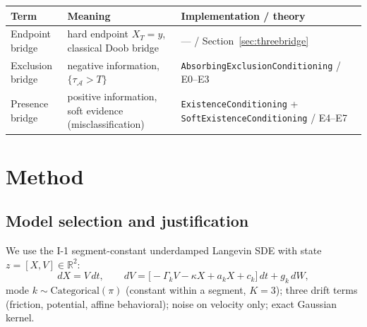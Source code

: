 \documentclass[11pt]{article}
\newcommand{\R}{\mathbb{R}}
\newcommand{\Aregion}{\mathcal{A}}
\begin{document}
\begin{center}
\small
\begin{tabular}{p{3.2cm}p{4.6cm}p{5.6cm}}
\toprule
Term & Meaning & Implementation / theory \\
\midrule
Endpoint bridge & hard endpoint $X_T=y$, classical Doob bridge & --- / Section~\ref{sec:threebridge} \\
Exclusion bridge & negative information, $\{\tau_{\Aregion}>T\}$ & \texttt{AbsorbingExclusionConditioning} / E0--E3 \\
Presence bridge & positive information, soft evidence (misclassification) & \texttt{ExistenceConditioning} + \texttt{SoftExistenceConditioning} / E4--E7 \\
\bottomrule
\end{tabular}
\end{center}

\section{Method}
\label{sec:method}

\subsection{Model selection and justification}
\label{sec:model-sel}
We use the I-1 segment-constant underdamped Langevin SDE with state $z=[X,V]\in\R^2$:
\begin{equation}
  dX=V\,dt,\qquad dV=\big[-\Gamma_k V-\kappa X+a_k X+c_k\big]\,dt+g_k\,dW,\label{eq:i1}
\end{equation}
mode $k\sim\mathrm{Categorical}(\pi)$ (constant within a segment, $K=3$); three drift
terms (friction, potential, affine behavioral); noise on velocity only; exact Gaussian
kernel.
\end{document}
